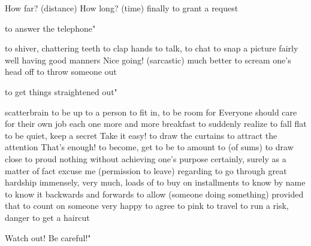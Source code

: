 {How far? (distance)}
{How long? (time)}
{finally}
{to grant a request}
{to answer the telephone"

{to shiver, chattering teeth}
{to clap hands}
{to talk, to chat}
{to snap a picture}
{fairly well}
{having good manners}
{Nice going! (sarcastic)}
{much better}
{to scream one’s head off}
{to throw someone out}
{to get things straightened out"

{scatterbrain}
{to be up to a person}
{to fit in, to be room for}
{Everyone should care for their own job}
{each one}
{more and more}
{breakfast}
{to suddenly realize}
{to fall flat}
{to be quiet, keep a secret}
{Take it easy!}
{to draw the curtains}
{to attract the attention}
{That’s enough!}
{to become, get to be}
{to amount to (of sums)}
{to draw close to}
{proud}
{nothing}
{without achieving one’s purpose}
{certainly, surely}
{as a matter of fact}
{excuse me (permission to leave)}
{regarding}
{to go through great hardship}
{immensely, very much, loads of}
{to buy on installments}
{to know by name}
{to know it backwards and forwards}
{to allow (someone doing something)}
{provided that}
{to count on someone}
{very happy}
{to agree to}
{pink}
{to travel}
{to run a risk, danger}
{to get a haircut}
{Watch out! Be careful!"

}}}
